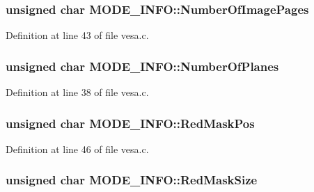 \subsubsection[{\texorpdfstring{Number\+Of\+Image\+Pages}{NumberOfImagePages}}]{\setlength{\rightskip}{0pt plus 5cm}unsigned char M\+O\+D\+E\+\_\+\+I\+N\+F\+O\+::\+Number\+Of\+Image\+Pages}\hypertarget{structMODE__INFO_a5c82ed2c8587e816e139e64fc82e3a97}{}\label{structMODE__INFO_a5c82ed2c8587e816e139e64fc82e3a97}


Definition at line 43 of file vesa.\+c.

\subsubsection[{\texorpdfstring{Number\+Of\+Planes}{NumberOfPlanes}}]{\setlength{\rightskip}{0pt plus 5cm}unsigned char M\+O\+D\+E\+\_\+\+I\+N\+F\+O\+::\+Number\+Of\+Planes}\hypertarget{structMODE__INFO_af2cab2389902deca91d2410ee8fbd067}{}\label{structMODE__INFO_af2cab2389902deca91d2410ee8fbd067}


Definition at line 38 of file vesa.\+c.

\subsubsection[{\texorpdfstring{Red\+Mask\+Pos}{RedMaskPos}}]{\setlength{\rightskip}{0pt plus 5cm}unsigned char M\+O\+D\+E\+\_\+\+I\+N\+F\+O\+::\+Red\+Mask\+Pos}\hypertarget{structMODE__INFO_a69b9f065c3877b921e1e28ae74d51029}{}\label{structMODE__INFO_a69b9f065c3877b921e1e28ae74d51029}


Definition at line 46 of file vesa.\+c.

\subsubsection[{\texorpdfstring{Red\+Mask\+Size}{RedMaskSize}}]{\setlength{\rightskip}{0pt plus 5cm}unsigned char M\+O\+D\+E\+\_\+\+I\+N\+F\+O\+::\+Red\+Mask\+Size}\hypertarget{structMODE__INFO_a913ed780543a2466489f9d2b54761c5d}{}\label{structMODE__INFO_a913ed780543a2466489f9d2b54761c5d}



